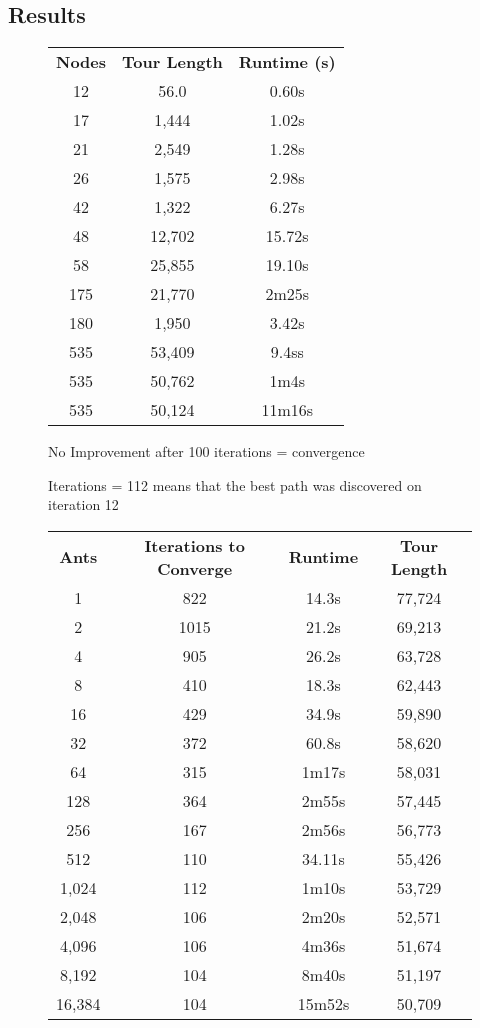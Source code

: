 \documentclass[a4paper, 11pt,table]{article}
\begin{document}
	\subsection{Results}
\begin{figure}
	\label{useCase:antResults}
	\begin{center}
		\begin{tabu}{|c c c|}
			\textbf{Nodes} & \textbf{Tour Length} & \textbf{Runtime (s)} \\
			12 & 56.0 & 0.60s \\
			17 & 1,444 & 1.02s \\
			21 & 2,549 & 1.28s \\
			26 & 1,575 & 2.98s \\
			42 & 1,322 & 6.27s \\
			48 & 12,702 & 15.72s \\
			58 & 25,855 & 19.10s \\
			175 & 21,770 & 2m25s \\
			180 & 1,950 & 3.42s \\
			535 & 53,409 & 9.4ss \\
			535 & 50,762 & 1m4s \\
			535 & 50,124 & 11m16s \\
		\end{tabu}
	\end{center}
\end{figure}
	
	\begin{figure}
	\begin{center}
		No Improvement after 100 iterations = convergence
		
		Iterations = 112 means that the best path was discovered on iteration 12
		
		\begin{tabu}{|c c c c|}
			\textbf{Ants} & \textbf{Iterations to Converge} & \textbf{Runtime} & \textbf{Tour Length} \\
			1 & 822 & 14.3s & 77,724 \\
			2 & 1015 & 21.2s & 69,213 \\
			4 & 905 & 26.2s & 63,728 \\
			8 & 410 & 18.3s & 62,443 \\
			16 & 429 & 34.9s & 59,890 \\
			32 & 372 & 60.8s & 58,620 \\
			64 & 315 & 1m17s & 58,031 \\
			128 & 364 & 2m55s & 57,445 \\
			256 & 167 & 2m56s & 56,773 \\
			512 & 110 & 34.11s & 55,426 \\
			1,024 & 112 & 1m10s & 53,729 \\
			2,048 & 106 & 2m20s & 52,571 \\
			4,096 & 106 & 4m36s & 51,674 \\
			8,192 & 104 & 8m40s & 51,197 \\
			16,384 & 104 & 15m52s & 50,709 \\
		\end{tabu}
	\end{center}
\end{figure}
	
\end{document}
